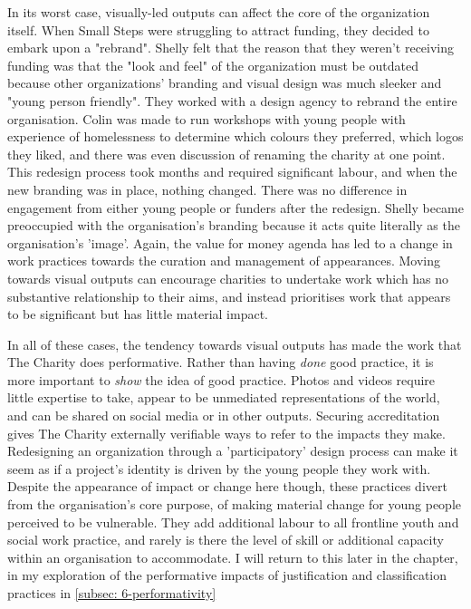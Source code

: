 In its worst case, visually-led outputs can affect the core of the organization itself. When Small Steps were struggling to attract funding, they decided to embark upon a "rebrand". Shelly felt that the reason that they weren't receiving funding was that the "look and feel" of the organization must be outdated because other organizations' branding and visual design was much sleeker and "young person friendly". They worked with a design agency to rebrand the entire organisation. Colin was made to run workshops with young people with experience of homelessness to determine which colours they preferred, which logos they liked, and there was even discussion of renaming the charity at one point. This redesign process took months and required significant labour, and  when the new branding was in place, nothing changed. There was no difference in engagement from either young people or funders after the redesign. Shelly became preoccupied with the organisation's branding because it acts quite literally as the organisation's 'image'. Again, the value for money agenda has led to a change in work practices towards the curation and management of appearances. Moving towards visual outputs can encourage charities to undertake work which has no substantive relationship to their aims, and instead prioritises work that appears to be significant but has little material impact.

In all of these cases, the tendency towards visual outputs has made the work that The Charity does performative. Rather than having \emph{done} good practice, it is more important to \emph{show} the idea of good practice. Photos and videos require little expertise to take, appear to be unmediated representations of the world, and can be shared on social media or in other outputs. Securing accreditation gives The Charity externally verifiable ways to refer to the impacts they make. Redesigning an organization through a 'participatory' design process can make it seem as if a project's identity is driven by the young people they work with. Despite the appearance of impact or change here though, these practices divert from the organisation's core purpose, of making material change for young people perceived to be vulnerable. They add additional labour to all frontline youth and social work practice, and rarely is there the level of skill or additional capacity within an organisation to accommodate. I will return to this later in the chapter, in my exploration of the performative impacts of justification and classification practices in \ref{subsec: 6-performativity} 

